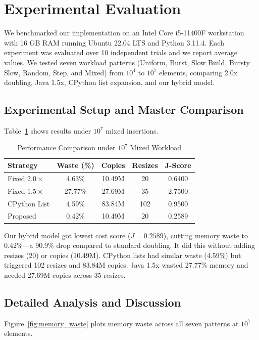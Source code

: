 \documentclass[conference]{IEEEtran}
\begin{document}
\section{Experimental Evaluation}
We benchmarked our implementation on an Intel Core i5-11400F workstation with 16 GB RAM running Ubuntu 22.04 LTS and Python 3.11.4. Each experiment was evaluated over 10 independent trials and we report average values. We tested seven workload patterns (Uniform, Burst, Slow Build, Bursty Slow, Random, Step, and Mixed) from $10^4$ to $10^7$ elements, comparing 2.0x doubling, Java 1.5x, CPython list expansion, and our hybrid model.

\subsection{Experimental Setup and Master Comparison}
Table~\ref{tab:comparison} shows results under $10^7$ mixed insertions.

\begin{table}[htbp]
\caption{Performance Comparison under $10^7$ Mixed Workload}
\label{tab:comparison}
\begin{center}
\begin{tabular}{lcccc}
\toprule
Strategy & Waste (\%) & Copies & Resizes & J-Score \\
\midrule
Fixed $2.0\times$ & 4.63\% & 10.49M & 20 & 0.6400 \\
Fixed $1.5\times$ & 27.77\% & 27.69M & 35 & 2.7500 \\
CPython List & 4.59\% & 83.84M & 102 & 0.9500 \\
Proposed & 0.42\% & 10.49M & 20 & 0.2589 \\
\bottomrule
\end{tabular}
\end{center}
\end{table}

Our hybrid model got lowest cost score ($J = 0.2589$), cutting memory waste to 0.42\%—a 90.9\% drop compared to standard doubling. It did this without adding resizes (20) or copies (10.49M). CPython lists had similar waste (4.59\%) but triggered 102 resizes and 83.84M copies. Java 1.5x wasted 27.77\% memory and needed 27.69M copies across 35 resizes.

\subsection{Detailed Analysis and Discussion}
Figure~\ref{fig:memory_waste} plots memory waste across all seven patterns at $10^7$ elements.
\end{document}
